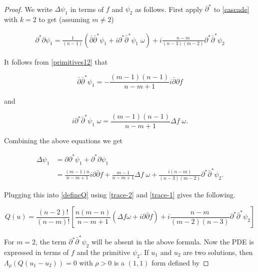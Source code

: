 \documentclass[11pt,letterpaper]{amsart}
\newcommand{\sbpartial}{\bar{\partial}^*}
\newcommand{\spartial}{\partial^*}
\newcommand{\bpartial}{\bar{\partial}}
\numberwithin{equation}{section}
\begin{document}
\

\begin{proof}


We write $\Delta \psi_1$ in terms of $f$ and $\psi_2$ as follows. First apply $\spartial$ to \eqref{cascade} with $k=2$ to get (assuming $m\neq 2$)

\begin{equation}
    \begin{aligned}
        \spartial \partial \psi_{1} = \frac{1}{(n-1)} \left(\bpartial \sbpartial \psi_1 + i \spartial \sbpartial \psi_1 \; \omega\right) + i \frac{n-m}{(n-3)(m-2)} \spartial \sbpartial \psi_2 
    \end{aligned}
\end{equation}

It follows from \eqref{primitives12} that 

$$ \bpartial \sbpartial \psi_1 = -\frac{(m-1)(n-1)}{n-m+1} i\bpartial \partial f$$

\noindent and

$$i \spartial \sbpartial \psi_1 \; \omega = \frac{(m-1)(n-1)}{n-m+1} \Delta f \; \omega.$$


Combining the above equations we get

\begin{equation}
\begin{aligned}
    \Delta \psi_1 &= \partial \spartial \psi_1 + \spartial \partial \psi_1\\
    &= \frac{(m-1)n}{n-m+1} i \partial \bpartial f + \frac{m-1}{n-m+1} \Delta f \; \omega + \frac{i(n-m)}{(n-3)(m-2)} \spartial \sbpartial \psi_2.
\end{aligned}
\end{equation}

Plugging this into \eqref{defineQ} using \eqref{trace-2} and \eqref{trace-1} gives the following.


\begin{equation}\label{Q-fp1}
    Q(u) = \frac{(n-2)!}{(n-m)!} \left[ \frac{n(m-n)}{n-m+1} (\Delta f \omega +   i \partial \bar{\partial} f) + i \frac{n-m}{(m-2)(n-3)} \partial^* \bar{\partial}^* \psi_2 \right]
\end{equation}


For $m=2$, the term $\partial^* \bar{\partial}^* \psi_2$ will be absent in the above formula. Now the PDE is expressed in terms of $f$ and the primitive $\psi_2$. If $u_1$ and $u_2$ are two solutions, then $\Lambda_{\rho}(Q(u_1 - u_2)) = 0$ with $\rho >0$ is a $(1,1)$ form defined by


\end{proof}
\end{document}
